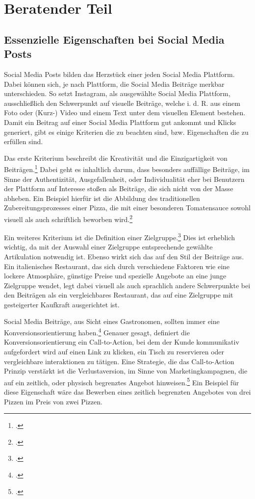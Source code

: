 \newpage
\section{Beratender Teil} \label{sec:beratender-teil}

\subsection{Essenzielle Eigenschaften bei Social Media Posts}
Social Media Posts bilden das Herzstück einer jeden Social Media Plattform.
Dabei können sich, je nach Plattform, die Social Media Beiträge merkbar unterschieden.
So setzt Instagram, als ausgewählte Social Media Plattform, ausschließlich den Schwerpunkt auf visuelle Beiträge, welche i. d. R. aus einem Foto oder (Kurz-) Video und einem Text unter dem visuellen Element bestehen.
Damit ein Beitrag auf einer Social Media Plattform gut ankommt und Klicks generiert, gibt es einige Kriterien die zu beachten sind, bzw. Eigenschaften die zu erfüllen sind.

Das erste Kriterium beschreibt die Kreativität und die Einzigartigkeit von Beiträgen.\footcite{kaplan_users_2010,keller_building_1993}
Dabei geht es inhaltlich darum, dass besonders auffällige Beiträge, im Sinne der Authentizität, Ausgefallenheit, oder Individualität eher bei Benutzern der Plattform auf Interesse stoßen als Beiträge, die sich nicht von der Masse abheben.
Ein Beispiel hierfür ist die Abbildung des traditionellen Zubereitungsprozesses einer Pizza, die mit einer besonderen Tomatensauce sowohl visuell als auch schriftlich beworben wird.\footcite{green_role_2000}

Ein weiteres Kriterium ist die Definition einer Zielgruppe.\footcite{kotler_marketing_management}
Dies ist erheblich wichtig, da mit der Auswahl einer Zielgruppe entsprechende gewählte Artikulation notwendig ist.
Ebenso wirkt sich das auf den Stil der Beiträge aus.
Ein italienisches Restaurant, das sich durch verschiedene Faktoren wie eine lockere Atmosphäre, günstige Preise und spezielle Angebote an eine junge Zielgruppe wendet, legt dabei visuell als auch sprachlich andere Schwerpunkte bei den Beiträgen als ein vergleichbares Restaurant, das auf eine Zielgruppe mit gesteigerter Kaufkraft ausgerichtet ist.

Social Media Beiträge, aus Sicht eines Gastronomen, sollten immer eine Konversionsorientierung haben.\footcite{website_quality_customer_satisfaction}
Genauer gesagt, definiert die Konversionsorientierung ein Call-to-Action, bei dem der Kunde kommunikativ aufgefordert wird auf einen Link zu klicken, ein Tisch zu reservieren oder vergleichbare interaktionen zu tätigen.
Eine Strategie, die das Call-to-Action Prinzip verstärkt ist die Verlustaversion, im Sinne von Marketingkampagnen, die auf ein zeitlich, oder physisch begrenztes Angebot hinweisen.\footcite{jstor_example}
Ein Beispiel für diese Eigenschaft wäre das Bewerben eines zeitlich begrenzten Angebotes von drei Pizzen im Preis von zwei Pizzen.


